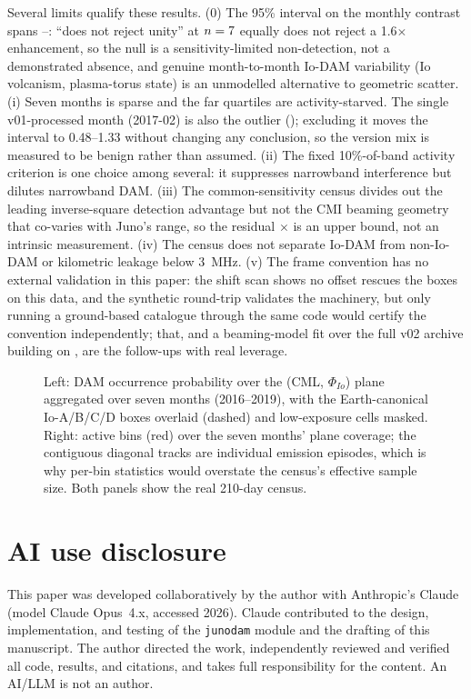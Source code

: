 \documentclass[twocolumn]{aastex631}
\newcommand{\code}[1]{\texttt{#1}}
\begin{document}
Several limits qualify these results. (0) The 95\% interval on the monthly contrast spans
\jdMonthCIlo--\jdMonthCIhi: ``does not reject unity'' at $n=7$ equally does not
reject a 1.6$\times$ enhancement, so the null is a sensitivity-limited non-detection, not a
demonstrated absence, and genuine month-to-month Io-DAM variability (Io volcanism, plasma-torus
state) is an unmodelled alternative to geometric scatter. (i) Seven months is sparse and the far
quartiles are activity-starved. The single v01-processed month (2017-02) is also the outlier
(\jdCmMax); excluding it moves the interval to 0.48--1.33 without changing any conclusion, so
the version mix is measured to be benign rather than assumed. (ii) The fixed 10\%-of-band
activity criterion is one choice among several: it suppresses narrowband interference but
dilutes narrowband DAM. (iii) The common-sensitivity census divides out the leading
inverse-square detection advantage but not the CMI beaming geometry that co-varies with Juno's
range, so the residual \jdNearFarCens$\times$ is an upper bound, not an intrinsic measurement.
(iv) The census does not separate Io-DAM from non-Io-DAM or kilometric leakage below 3~MHz.
(v) The frame convention has no external validation in this paper: the shift scan shows no
offset rescues the boxes on this data, and the synthetic round-trip validates the machinery,
but only running a ground-based catalogue through the same code would certify the convention
independently; that, and a beaming-model fit over the full v02 archive building on
\citet{louis2021jgr}, are the follow-ups with real leverage.

\begin{figure}
\caption{Left: DAM occurrence probability over the (CML, $\Phi_{Io}$) plane aggregated
over seven months (2016--2019), with the Earth-canonical Io-A/B/C/D boxes overlaid (dashed) and low-exposure cells
masked. Right: active bins (red) over the seven months' plane coverage; the contiguous diagonal tracks
are individual emission episodes, which is why per-bin statistics would overstate the census's
effective sample size. Both panels show the real 210-day census.}
\label{fig:jd}
\end{figure}

\section*{AI use disclosure}
This paper was developed collaboratively by the author with Anthropic's Claude
\citep{anthropicclaude} (model Claude Opus~4.x, accessed 2026). Claude contributed to the design,
implementation, and testing of the \code{junodam} module and the drafting of this manuscript.
The author directed the work, independently reviewed and verified all code, results, and
citations, and takes full responsibility for the content. An AI/LLM is not an author.
\end{document}
